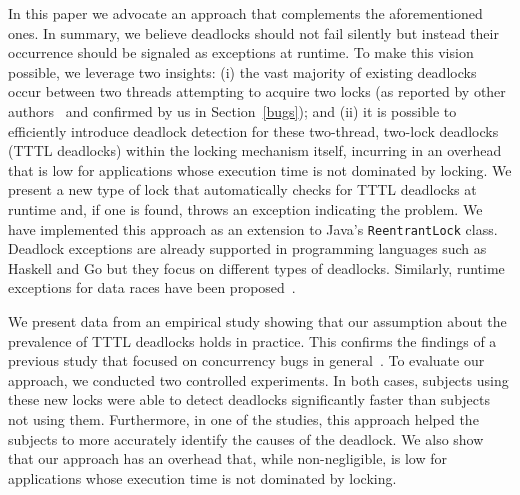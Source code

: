 In this paper we advocate an approach that complements the aforementioned ones. In summary, we believe deadlocks should not fail silently but instead their occurrence should be signaled as exceptions at runtime. To make this vision possible, we leverage two insights: (i) the vast majority of existing deadlocks occur between two threads attempting to acquire two locks (as reported by other authors~\cite{lu} and confirmed by us in Section~\ref{bugs}); and (ii) it is possible to efficiently introduce deadlock detection for these two-thread, two-lock deadlocks (TTTL deadlocks) within the locking mechanism itself, incurring in an overhead that is low for applications whose execution time is not dominated by locking. We present a new type of lock that automatically checks for TTTL deadlocks at runtime and, if one is found, throws an exception indicating the problem. We have implemented this approach as an extension to Java's {\tt ReentrantLock} class. Deadlock exceptions are already supported in programming languages such as Haskell \cite{marlow} and Go \cite{golang} but they focus on different types of deadlocks.
Similarly, runtime exceptions for data races have been proposed~\cite{valor}.

We present data from an empirical study showing that our assumption about the prevalence of TTTL deadlocks holds in practice. This confirms the findings of a previous study that focused on concurrency bugs in general~\cite{lu}. 
To evaluate our approach, we conducted two controlled experiments. In both cases, subjects using these new locks were able to detect deadlocks significantly faster than subjects not using them.  Furthermore, in one of the studies, this approach helped the subjects to more accurately identify the causes of the deadlock. We also show that our approach has an overhead that, while non-negligible, is low for applications whose execution time is not dominated by locking.

